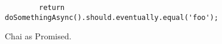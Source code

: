 
\begin{figure}[H]
	\centering
	\begin{lstlisting}
		return doSomethingAsync().should.eventually.equal('foo');
	\end{lstlisting}
	\caption[Chai as Promised]{Chai as Promised.}
    \label{fig:chai_as_promised}
\end{figure}
